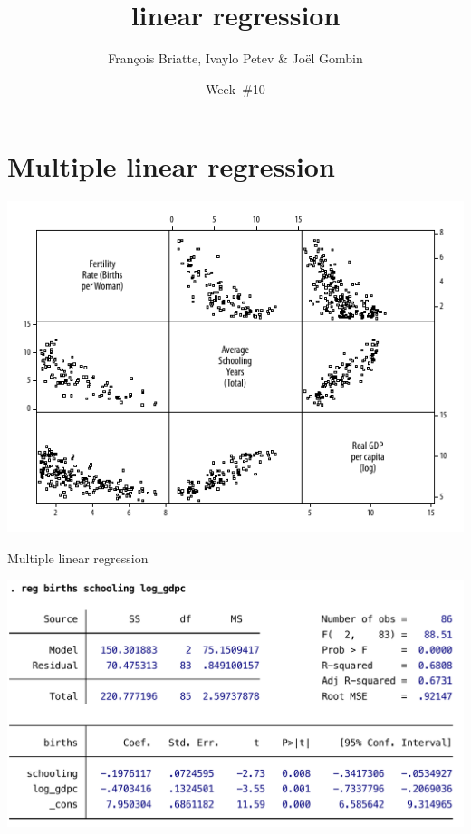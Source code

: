 \documentclass[t]{beamer}
\title{linear regression}
\author{François Briatte, Ivaylo Petev \& Joël Gombin}
\date{Week~\#10}
\begin{document}
    

    \frame[plain]{
        \titlepage\\[7em]
        \tableofcontents[hideallsubsections]
        }

    

    \section{Multiple linear regression}

	\begin{frame}[c]%
			
		\begin{center}
			\includegraphics[width=\textwidth]{mreg-gr-mat.pdf}
		\end{center}
				
	\end{frame}
	
	\begin{frame}[c]{Multiple linear regression} %
			
		\begin{center}
			\includegraphics[width=\textwidth]{mreg-output.pdf}
		\end{center}
				
	\end{frame}	
	
\end{document}
